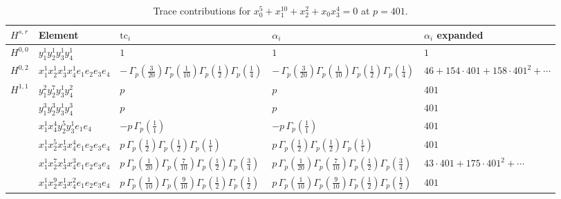 \documentclass[11pt]{article}
\begin{document}
\begin{table}[ht]
\centering
\caption{Trace contributions for $x_0^{5} + x_1^{10} + x_2^{2} + x_0 x_3^{4} = 0$ at $p=401$.}\label{tab:deformed-17}
\renewcommand{\arraystretch}{1.1}
{\scriptsize
\begin{tabular}{@{}lllll@{}}
\toprule
$H^{s,r}$ & Element & $\mathrm{tc}_i$ & $\alpha_i$ & $\alpha_i$ expanded \\
\midrule
$H^{0,0}$ & $y_{1}^{1} y_{2}^{1} y_{3}^{1} y_{4}^{1}$ & $1$ & $1$ & $1$ \\
\midrule
$H^{0,2}$ & $x_{1}^{1} x_{2}^{1} x_{3}^{1} x_{4}^{1}  e_{1} e_{2} e_{3} e_{4}$ & $- \, \Gamma_p \left( \frac{3}{20} \right) \Gamma_p \left( \frac{1}{10} \right) \Gamma_p \left( \frac{1}{2} \right) \Gamma_p \left( \frac{1}{4} \right)$ & $- \, \Gamma_p \left( \frac{3}{20} \right) \Gamma_p \left( \frac{1}{10} \right) \Gamma_p \left( \frac{1}{2} \right) \Gamma_p \left( \frac{1}{4} \right)$ & $46{+}154{\cdot}401{+}158{\cdot}401^{2}{+}\cdots$ \\
\midrule
$H^{1,1}$ & $y_{1}^{2} y_{2}^{7} y_{3}^{1} y_{4}^{2}$ & $p \,$ & $p \,$ & $401$ \\
 & $y_{1}^{3} y_{2}^{3} y_{3}^{1} y_{4}^{3}$ & $p \,$ & $p \,$ & $401$ \\
 & $x_{1}^{1} x_{4}^{4} y_{2}^{5} y_{3}^{1} e_{1} e_{4}$ & $- p \, \Gamma_p \left( \frac{1}{1} \right)$ & $- p \, \Gamma_p \left( \frac{1}{1} \right)$ & $401$ \\
 & $x_{1}^{1} x_{2}^{5} x_{3}^{1} x_{4}^{4}  e_{1} e_{2} e_{3} e_{4}$ & $p \, \Gamma_p \left( \frac{1}{2} \right) \Gamma_p \left( \frac{1}{2} \right) \Gamma_p \left( \frac{1}{1} \right)$ & $p \, \Gamma_p \left( \frac{1}{2} \right) \Gamma_p \left( \frac{1}{2} \right) \Gamma_p \left( \frac{1}{1} \right)$ & $401$ \\
 & $x_{1}^{1} x_{2}^{7} x_{3}^{1} x_{4}^{3}  e_{1} e_{2} e_{3} e_{4}$ & $p \, \Gamma_p \left( \frac{1}{20} \right) \Gamma_p \left( \frac{7}{10} \right) \Gamma_p \left( \frac{1}{2} \right) \Gamma_p \left( \frac{3}{4} \right)$ & $p \, \Gamma_p \left( \frac{1}{20} \right) \Gamma_p \left( \frac{7}{10} \right) \Gamma_p \left( \frac{1}{2} \right) \Gamma_p \left( \frac{3}{4} \right)$ & $43{\cdot}401{+}175{\cdot}401^{2}{+}\cdots$ \\
 & $x_{1}^{1} x_{2}^{9} x_{3}^{1} x_{4}^{2}  e_{1} e_{2} e_{3} e_{4}$ & $p \, \Gamma_p \left( \frac{1}{10} \right) \Gamma_p \left( \frac{9}{10} \right) \Gamma_p \left( \frac{1}{2} \right) \Gamma_p \left( \frac{1}{2} \right)$ & $p \, \Gamma_p \left( \frac{1}{10} \right) \Gamma_p \left( \frac{9}{10} \right) \Gamma_p \left( \frac{1}{2} \right) \Gamma_p \left( \frac{1}{2} \right)$ & $401$ \\

\end{tabular}}
\end{table}
\end{document}
